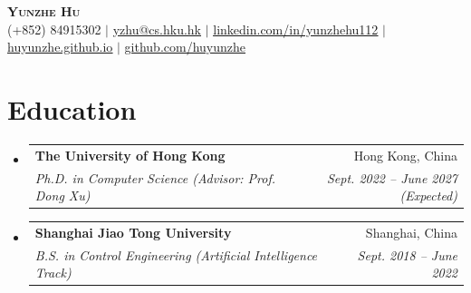 \documentclass[letterpaper,11pt]{article}
\makeatletter
\newcommand{\resumeSubheading}[4]{
  \vspace{-2pt}\item
    \begin{tabular*}{0.97\textwidth}[t]{l@{\extracolsep{\fill}}r}
      \textbf{#1} & #2 \\
      \textit{\small#3} & \textit{\small #4} \\
    \end{tabular*}\vspace{-7pt}
}
\newcommand{\resumeSubHeadingListStart}{\begin{itemize}[leftmargin=0.15in, label={}]}
\newcommand{\resumeSubHeadingListEnd}{\end{itemize}}
\makeatother
\begin{document}
\begin{center}
    \textbf{\Huge \scshape Yunzhe Hu} \\ \vspace{1pt}
    \small (+852) 84915302 $|$ 
    \href{mailto:yzhu@cs.hku.hk}{\underline{yzhu@cs.hku.hk}} $|$ 
    \href{https://www.linkedin.com/in/yunzhehu112}{\underline{linkedin.com/in/yunzhehu112}} $|$
    \href{https://huyunzhe.github.io}{\underline{huyunzhe.github.io}} $|$
    \href{https://github.com/huyunzhe}{\underline{github.com/huyunzhe}}
\end{center}


\section{Education}
  \resumeSubHeadingListStart
    \resumeSubheading
      {The University of Hong Kong}{Hong Kong, China}
      {Ph.D. in Computer Science (Advisor: Prof. Dong Xu)}{Sept. 2022 -- June 2027 (Expected)}
    \resumeSubheading
      {Shanghai Jiao Tong University}{Shanghai, China}
      {B.S. in Control Engineering (Artificial Intelligence Track)}{Sept. 2018 -- June 2022}
  \resumeSubHeadingListEnd

\end{document}
